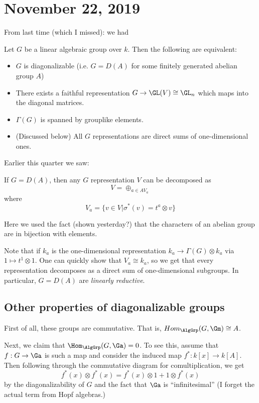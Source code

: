\documentclass[12pt]{article}
\begin{document}
\section{November 22, 2019}
From last time (which I missed): we had
\begin{prop}
	Let $G$ be a linear algebraic group over $k$. Then the following are equivalent:
	\begin{itemize}
		\item $G$ is diagonalizable (i.e. $G=D(A)$ for some finitely generated abelian group $A$)
		\item There exists a faithful representation $G\to \GL(V)\cong \GL_n$ which maps into the diagonal matrices.
		\item $\Gamma(G)$ is spanned by grouplike elements.
		\item (Discussed below) All $G$ representations are direct sums of one-dimensional ones.
	\end{itemize}
\end{prop}
Earlier this quarter we saw:
\begin{prop}
	If $G=D(A)$, then any $G$ representation $V$ can be decomposed as 
	\[V=\oplus_{a\in A V_a}\]
	where 
	\[V_a=\{v\in V|\sigma^\ast(v)=t^a\otimes v\}\]
\end{prop}
\begin{rmk}
	Here we used the fact (shown yesterday?) that the characters of an abelian group are in bijection with elements.
\end{rmk}
Note that if $k_a$ is the one-dimensional representation $k_a\to\Gamma(G)\otimes k_a$ via $1\mapsto t^1\otimes 1$. One can 
quickly show that $V_a\cong k_a$, so we get that every representation decomposes as a direct sum of one-dimensional subgroups. In particular, 
$G=D(A)$ are \textit{linearly reductive}.

\subsection{Other properties of diagonalizable groups}
First of all, these groups are commutative. That is, $Hom_\AlgGrp(G,\Gm)\cong A$.

Next, we claim that $\Hom_\AlgGrp(G,\Ga)=0$. To see this, assume that $f:G\to \Ga$ is such a map and consider the 
induced map $f^\ast:k[x]\to k[A]$. Then following through the commutative diagram for comultiplication, we get
\[f^\ast(x)\otimes f^\ast(x)=f^\ast(x)\otimes 1+1\otimes f^\ast(x)\]
by the diagonalizability of $G$ and the fact that $\Ga$ is ``infinitesimal'' (I forget the actual term from Hopf algebras.)
\end{document}
